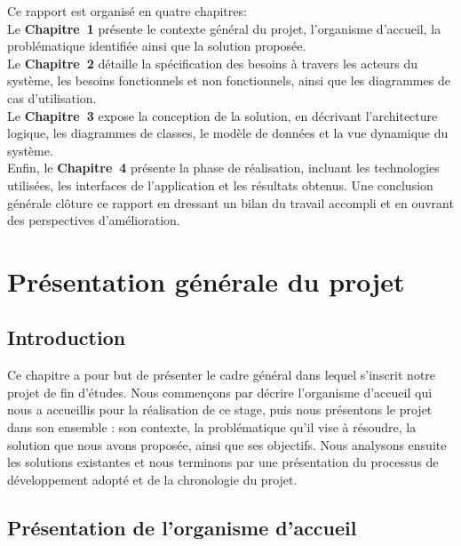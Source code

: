 \documentclass[12pt, a4paper, oneside]{report}
\begin{document}
Ce rapport est organisé en quatre chapitres:\\
Le \textbf{Chapitre~1} présente le
contexte général du projet, l'organisme d'accueil, la problématique identifiée
ainsi que la solution proposée.\\ Le \textbf{Chapitre~2} détaille la spécification
des besoins à travers les acteurs du système, les besoins fonctionnels et non
fonctionnels, ainsi que les diagrammes de cas d'utilisation.\\ Le \textbf{Chapitre~3}
expose la conception de la solution, en décrivant l'architecture logique, les
diagrammes de classes, le modèle de données et la vue dynamique du système.\\
Enfin, le \textbf{Chapitre~4} présente la phase de réalisation, incluant les
technologies utilisées, les interfaces de l'application et les résultats obtenus.
Une conclusion générale clôture ce rapport en dressant un bilan du travail accompli
et en ouvrant des perspectives d'amélioration.

\chapter{Présentation générale du projet}
\label{chap:presentation}

\section*{Introduction}

Ce chapitre a pour but de présenter le cadre général dans lequel s'inscrit notre
projet de fin d'études. Nous commençons par décrire l'organisme d'accueil qui nous
a accueillis pour la réalisation de ce stage, puis nous présentons le projet dans
son ensemble : son contexte, la problématique qu'il vise à résoudre, la solution
que nous avons proposée, ainsi que ses objectifs. Nous analysons ensuite les
solutions existantes et nous terminons par une présentation du processus de
développement adopté et de la chronologie du projet.

\section{Présentation de l'organisme d'accueil}
\label{sec:organisme}
\end{document}
